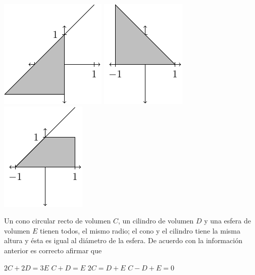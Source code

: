 \documentclass[10pt,letterpaper,addpoints]{exam}
\begin{document}
\begin{multicols}{2}
\begin{questions}
\begin{choices}
\begin{multicols}{2}
\choice \includegraphics[scale=.75]{Images/desigB.pdf} 
\choice \includegraphics[scale=.75]{Images/desigC.pdf} 
\choice \includegraphics[scale=.75]{Images/desigD.pdf} 
\end{multicols}
\end{choices}
\question Un cono circular recto de volumen $C$, un cilindro de volumen $D$ y una esfera de volumen $E$ tienen todos, el mismo radio; el cono y el cilindro tiene la misma altura y ésta es igual al diámetro de la esfera. De acuerdo con la información anterior es correcto afirmar que
\begin{choices}
  \choice $ 2C+2D=3E $
  \choice $ C+D=E $
  \choice $ 2C=D+E $
  \CorrectChoice $ C-D+E=0 $
\end{choices}
 \begin{center}
  \begin{tikzpicture}[scale=5,>=stealth]

\end{tikzpicture}
\end{center}
\end{questions}
\end{multicols}
\end{document}
